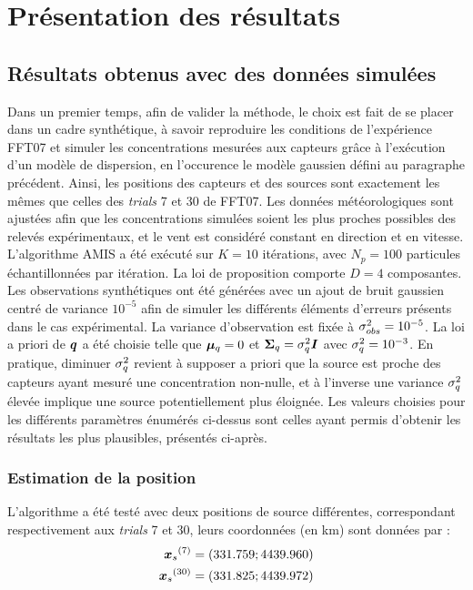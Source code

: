 \section{Présentation des résultats}

\subsection{Résultats obtenus avec des données simulées}
\label{par_simule}

Dans un premier temps, afin de valider la méthode, le choix est fait de se placer dans un cadre synthétique, à savoir reproduire les conditions de l'expérience FFT07 et simuler les concentrations mesurées aux capteurs grâce à l'exécution d'un modèle de dispersion, en l'occurence le modèle gaussien défini au paragraphe précédent. Ainsi, les positions des capteurs et des sources sont exactement les mêmes que celles des \textit{trials} 7 et 30 de FFT07. Les données météorologiques sont ajustées afin que les concentrations simulées soient les plus proches possibles des relevés expérimentaux, et le vent est considéré constant en direction et en vitesse. \\

L'algorithme AMIS a été exécuté sur $K = 10$ itérations, avec $N_p = 100$ particules échantillonnées par itération. {La loi de proposition comporte $D=4$ composantes.} Les observations synthétiques ont été générées avec un ajout de bruit gaussien centré de variance $10^{-5}$ afin de simuler les différents éléments d'erreurs présents dans le cas expérimental. La variance d'observation est fixée à ${\sigma_{obs}^2} = 10^{-5}$. La loi a priori de ${\bm{q}}$ a été choisie telle que ${\bm{\mu}_q} = 0$ et ${\bm{\Sigma}_q} = \sigma_q^2 \bm{I}$ avec $\sigma_q^2 = 10^{-3}$. En pratique, diminuer $\sigma_q^2$ revient à supposer {a priori} que la source est proche des capteurs ayant mesuré une concentration non-nulle, et à l'inverse une variance $\sigma_q^2$ élevée implique une source potentiellement plus éloignée. 
{Les valeurs choisies} pour les différents paramètres énumérés ci-dessus sont celles ayant permis d'obtenir les résultats les plus plausibles, présentés ci-après. \\

\subsubsection{Estimation de la position}

L'algorithme a été testé avec deux positions de source différentes, correspondant respectivement aux \textit{trials} 7 et 30, leurs coordonnées (en km) sont données par : 
\begin{equation}
\begin{split}
{\bm{x}_s}^{(7)} &= (331.759;4439.960) \\
{\bm{x}_s}^{(30)} &= (331.825;4439.972)
\end{split}
\end{equation}

